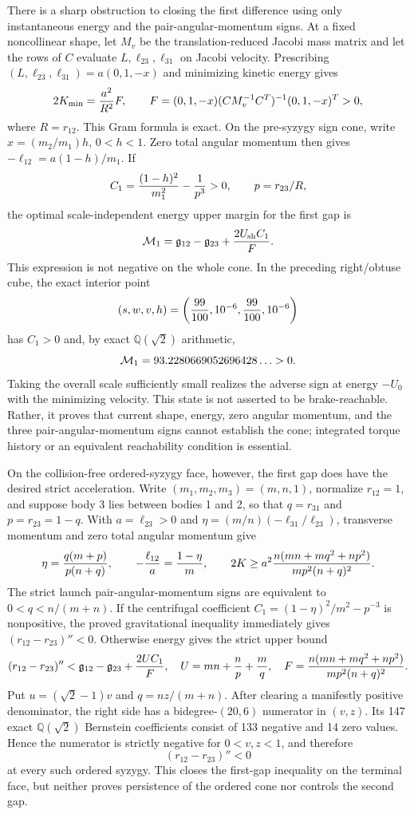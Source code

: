 \documentclass[11pt]{article}
\begin{document}
There is a sharp obstruction to closing the first difference using only
instantaneous energy and the pair-angular-momentum signs.  At a fixed noncollinear shape,
let $M_v$ be the translation-reduced Jacobi mass matrix and let the rows of
$C$ evaluate $L,\ell_{23},\ell_{31}$ on Jacobi velocity. Prescribing
$(L,\ell_{23},\ell_{31})=a(0,1,-x)$ and minimizing kinetic energy gives
\[
 2K_{\min}={a^2\over R^2}F,\qquad
 F=(0,1,-x)(CM_v^{-1}C^T)^{-1}(0,1,-x)^T>0,
\]
where $R=r_{12}$.  This Gram formula is exact.  On the pre-syzygy sign cone,
write $x=(m_2/m_1)h$, $0<h<1$. Zero total angular momentum then gives
$-\ell_{12}=a(1-h)/m_1$. If
\[
 C_1={(1-h)^2\over m_1^2}-{1\over p^3}>0,\qquad p=r_{23}/R,
\]
the optimal scale-independent energy upper margin for the first gap is
\[
 {\cal M}_1=\mathfrak g_{12}-\mathfrak g_{23}
              +{2U_{\rm sh}C_1\over F}.
\]
This expression is not negative on the whole cone.  In the preceding
right/obtuse cube, the exact interior point
\[
 (s,w,v,h)=\left({99\over100},10^{-6},{99\over100},10^{-6}\right)
\]
has $C_1>0$ and, by exact $\mathbb Q(\sqrt2)$ arithmetic,
\[
 {\cal M}_1=93.2280669052696428\ldots>0.
\]
Taking the overall scale sufficiently small realizes the adverse sign at
energy $-U_0$ with the minimizing velocity.  This state is not asserted to
be brake-reachable.  Rather, it proves that current shape, energy, zero
angular momentum, and the three pair-angular-momentum signs cannot establish the cone;
integrated torque history or an equivalent reachability condition is
essential.

On the collision-free ordered-syzygy face, however, the first gap does have
the desired strict acceleration.  Write $(m_1,m_2,m_3)=(m,n,1)$, normalize
$r_{12}=1$, and suppose body 3 lies between bodies 1 and 2, so that
$q=r_{31}$ and $p=r_{23}=1-q$.  With $a=\ell_{23}>0$ and
$\eta=(m/n)(-\ell_{31}/\ell_{23})$, transverse momentum and zero total
angular momentum give
\[
 \eta={q(m+p)\over p(n+q)},\qquad
 -{\ell_{12}\over a}={1-\eta\over m},
 \qquad
 2K\ge a^2{n(mn+mq^2+np^2)\over mp^2(n+q)^2}.
\]
The strict launch pair-angular-momentum signs are equivalent to
$0<q<n/(m+n)$.  If the centrifugal coefficient
$C_1=(1-\eta)^2/m^2-p^{-3}$ is nonpositive, the proved gravitational
inequality immediately gives $(r_{12}-r_{23})''<0$.  Otherwise energy gives
the strict upper bound
\[
 (r_{12}-r_{23})''<
 \mathfrak g_{12}-\mathfrak g_{23}+{2UC_1\over F},
 \quad
 U=mn+{n\over p}+{m\over q},
 \quad
 F={n(mn+mq^2+np^2)\over mp^2(n+q)^2}.
\]
Put $u=(\sqrt2-1)v$ and $q=nz/(m+n)$.  After clearing a manifestly positive
denominator, the right side has a bidegree-$(20,6)$ numerator in $(v,z)$.
Its 147 exact $\mathbb Q(\sqrt2)$ Bernstein coefficients consist of 133
negative and 14 zero values.  Hence the numerator is strictly negative for
$0<v,z<1$, and therefore
\[
 \boxed{(r_{12}-r_{23})''<0}
\]
at every such ordered syzygy.  This closes the first-gap inequality on the
terminal face, but neither proves persistence of the ordered cone nor
controls the second gap.
\end{document}
